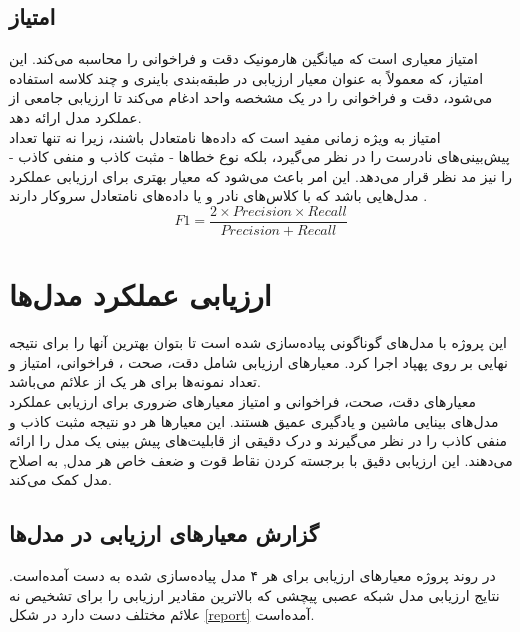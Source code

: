 \subsection{امتیاز }
امتیاز  معیاری است که میانگین هارمونیک دقت و فراخوانی را محاسبه می‌کند. این امتیاز، که معمولاً به عنوان معیار ارزیابی در طبقه‌بندی باینری و چند کلاسه استفاده می‌شود، دقت و فراخوانی را در یک مشخصه
واحد ادغام می‌کند تا ارزیابی جامعی از عملکرد مدل ارائه دهد.
\\
امتیاز  به ویژه زمانی مفید است که داده‌ها نامتعادل باشند، زیرا نه تنها تعداد پیش‌بینی‌های نادرست را در نظر می‌گیرد، بلکه نوع خطاها - مثبت کاذب و منفی کاذب - را نیز مد نظر قرار می‌دهد. این امر باعث می‌شود که  معیار بهتری برای ارزیابی عملکرد مدل‌هایی باشد که با کلاس‌های نادر و یا داده‌های نامتعادل سروکار دارند \cite{F1scorei14:online}.
\begin{equation}
    F1  = \frac{2 \times Precision \times Recall}{Precision + Recall} 
\end{equation}



\section{ارزیابی عملکرد مدل‌ها}

این پروژه با مدل‌های گوناگونی پیاده‌سازی شده است تا بتوان بهترین آنها را برای نتیجه نهایی بر روی پهپاد اجرا کرد. معیارهای ارزیابی شامل دقت، صحت ، فراخوانی، امتیاز  و
تعداد نمونه‌ها برای هر یک از علائم‌ می‌باشد.
\\
معیار‌های دقت، صحت، فراخوانی و امتیاز  معیارهای ضروری برای ارزیابی عملکرد مدل‌های بینایی ماشین و یادگیری عمیق هستند. این معیار‌ها هر دو نتیجه مثبت کاذب و منفی کاذب را در نظر
می‌گیرند و درک دقیقی از قابلیت‌های پیش بینی یک مدل را ارائه می‌دهند. این ارزیابی دقیق با برجسته کردن نقاط قوت و ضعف خاص هر مدل, به اصلاح مدل کمک می‌کند.


\subsection{گزارش معیارهای ارزیابی در مدل‌ها}
در روند پروژه معیار‌های ارزیابی برای هر ۴ مدل پیاده‌سازی شده به دست آمده‌است. نتایج ارزیابی مدل‌ شبکه عصبی پیچشی که بالاترین مقادیر ارزیابی را برای تشخیص نه علائم مختلف دست دارد در شکل \ref{report} آمده‌است.


